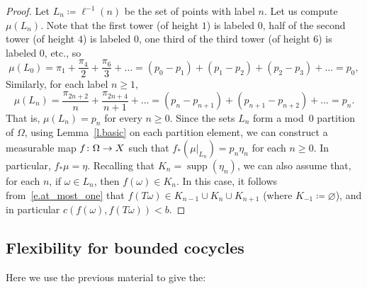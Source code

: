 \documentclass[10pt]{amsart}
\theoremstyle{definition}\newtheorem{defi}[theo]{Definition}\newtheorem{rema}[theo]{Remark}\newtheorem{exam}[theo]{Example}\newtheorem{exem}[theo]{Example}\newtheorem{nota}[theo]{Notation}
\DeclareMathOperator{\supp}{supp}
\renewcommand{\emptyset}{\varnothing}
\renewcommand*{\to}{\mathchoice{\longrightarrow}{\rightarrow}{\rightarrow}{\rightarrow}}
\begin{document}
\begin{proof}
Let $L_n \coloneq \ell^{-1}(n)$ be the set of points with label $n$. Let us compute $\mu(L_n)$. Note that the first tower (of height $1$) is labeled $0$, half of the second tower (of height $4$) is labeled $0$, one third of the third tower (of height $6$) is labeled $0$, etc., so
\begin{equation}
\mu(L_0) = \pi_1 + \frac{\pi_4}{2} + \frac{\pi_6}{3} + \dots = (p_0-p_1) + (p_1-p_2) + (p_2-p_3) + \dots = p_0,
\end{equation}
Similarly, for each label $n\ge 1$,
\begin{equation}
\mu(L_n) = \frac{\pi_{2n+2}}{n} + \frac{\pi_{2n+4}}{n+1} + \dots = (p_n - p_{n+1}) + (p_{n+1} - p_{n+2}) + \dots = p_n.
\end{equation}
That is, $\mu(L_n) = p_n$ for every $n \ge 0$. Since the sets $L_n$ form a mod~$0$ partition of $\Omega$, using Lemma~\ref{l.basic} on each partition element, we can construct a measurable map $f \colon \Omega \to X$ such that $f_* (\mu|_{L_n}) = p_n \eta_n$ for each $n \ge 0$. In particular, $f_*\mu = \eta$. Recalling that $K_n = \supp(\eta_n)$, we can also assume that, for each $n$, if $\omega \in L_n$, then $f(\omega) \in K_n$. In this case, it follows from~\eqref{e.at_most_one} that $f(T \omega) \in K_{n-1} \cup K_n \cup K_{n+1}$ (where $K_{-1} \coloneq \emptyset$), and in particular $c(f(\omega),f(T \omega)) < b $.
\end{proof}


\pagebreak{}
\subsection{Flexibility for bounded cocycles}\label{ss.bounded}

Here we use the previous material to give the:
\end{document}
